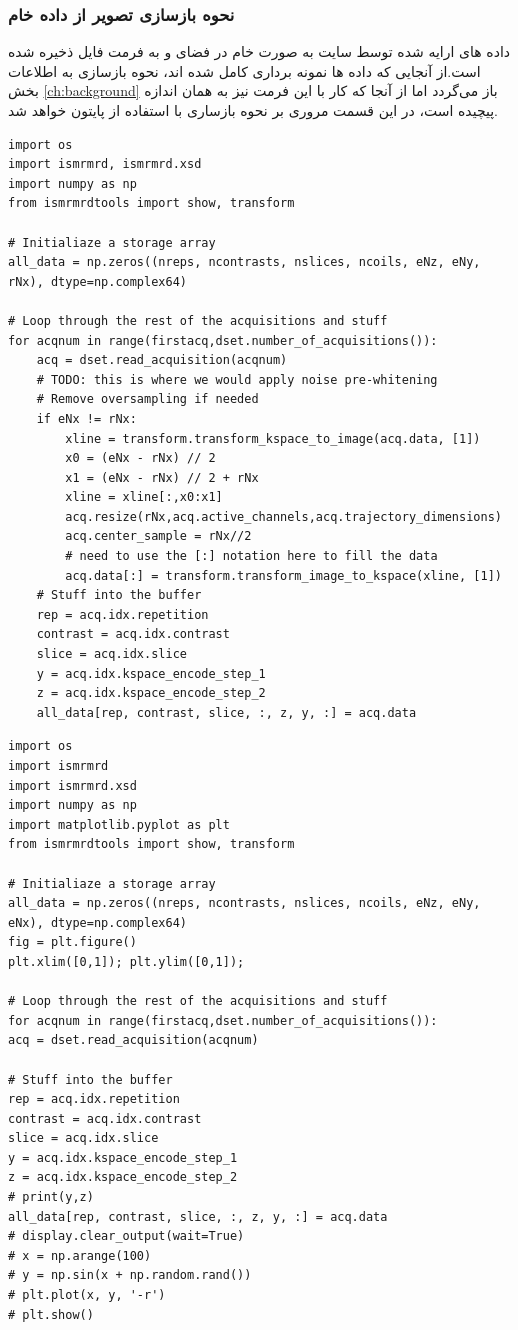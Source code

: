 \subsubsection{نحوه بازسازی تصویر از داده خام}
داده های ارایه شده توسط سایت 
به صورت خام در فضای \kspace و به فرمت فایل 
ذخیره شده است.از آنجایی که داده ها نمونه برداری کامل شده اند، نحوه بازسازی به اطلاعات بخش \ref{ch:background}
باز می‌گردد اما از آنجا که کار با این فرمت نیز به همان اندازه پیچیده است، در این قسمت مروری بر نحوه بازساری با استفاده از پایتون خواهد شد. 

\begin{latin}
\begin{lstlisting}
import os
import ismrmrd, ismrmrd.xsd
import numpy as np
from ismrmrdtools import show, transform

# Initialiaze a storage array
all_data = np.zeros((nreps, ncontrasts, nslices, ncoils, eNz, eNy, rNx), dtype=np.complex64)

# Loop through the rest of the acquisitions and stuff
for acqnum in range(firstacq,dset.number_of_acquisitions()):
	acq = dset.read_acquisition(acqnum)
	# TODO: this is where we would apply noise pre-whitening
	# Remove oversampling if needed
	if eNx != rNx:
		xline = transform.transform_kspace_to_image(acq.data, [1])
		x0 = (eNx - rNx) // 2
		x1 = (eNx - rNx) // 2 + rNx
		xline = xline[:,x0:x1]
		acq.resize(rNx,acq.active_channels,acq.trajectory_dimensions)
		acq.center_sample = rNx//2
		# need to use the [:] notation here to fill the data
		acq.data[:] = transform.transform_image_to_kspace(xline, [1])
	# Stuff into the buffer
	rep = acq.idx.repetition
	contrast = acq.idx.contrast
	slice = acq.idx.slice
	y = acq.idx.kspace_encode_step_1
	z = acq.idx.kspace_encode_step_2
	all_data[rep, contrast, slice, :, z, y, :] = acq.data
\end{lstlisting}
\end{latin}




\begin{latin}
\begin{lstlisting}
import os
import ismrmrd
import ismrmrd.xsd
import numpy as np
import matplotlib.pyplot as plt
from ismrmrdtools import show, transform

# Initialiaze a storage array
all_data = np.zeros((nreps, ncontrasts, nslices, ncoils, eNz, eNy, eNx), dtype=np.complex64)
fig = plt.figure()
plt.xlim([0,1]); plt.ylim([0,1]);

# Loop through the rest of the acquisitions and stuff
for acqnum in range(firstacq,dset.number_of_acquisitions()):
acq = dset.read_acquisition(acqnum)

# Stuff into the buffer
rep = acq.idx.repetition
contrast = acq.idx.contrast
slice = acq.idx.slice
y = acq.idx.kspace_encode_step_1
z = acq.idx.kspace_encode_step_2
# print(y,z)
all_data[rep, contrast, slice, :, z, y, :] = acq.data
# display.clear_output(wait=True)
# x = np.arange(100)
# y = np.sin(x + np.random.rand())
# plt.plot(x, y, '-r')
# plt.show()
\end{lstlisting}
\end{latin}




